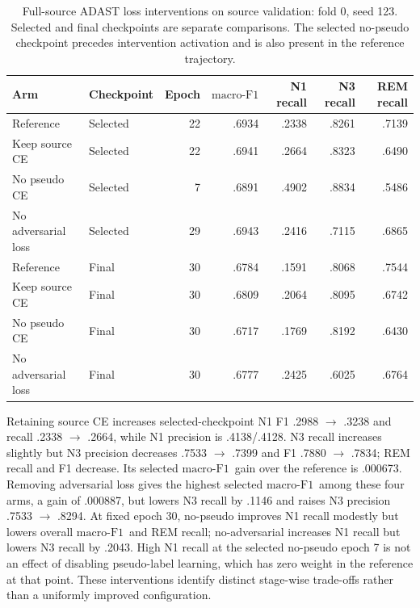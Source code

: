 \documentclass[10pt,a4paper]{article}
\newcommand{\mf}{\ensuremath{\mathrm{macro\text{-}F1}}}
\begin{document}
\begin{table}[H]
\centering\small
\caption{Full-source ADAST loss interventions on source validation: fold 0, seed 123.
Selected and final checkpoints are separate comparisons. The selected no-pseudo checkpoint
precedes intervention activation and is also present in the reference trajectory.}
\label{tab:sup_adast_loss_development}
\begin{tabular}{llrrrrr}
\toprule
Arm & Checkpoint & Epoch & \mf & N1 recall & N3 recall & REM recall \\
\midrule
Reference & Selected & 22 & .6934 & .2338 & .8261 & .7139 \\
Keep source CE & Selected & 22 & .6941 & .2664 & .8323 & .6490 \\
No pseudo CE & Selected & 7 & .6891 & .4902 & .8834 & .5486 \\
No adversarial loss & Selected & 29 & .6943 & .2416 & .7115 & .6865 \\
\midrule
Reference & Final & 30 & .6784 & .1591 & .8068 & .7544 \\
Keep source CE & Final & 30 & .6809 & .2064 & .8095 & .6742 \\
No pseudo CE & Final & 30 & .6717 & .1769 & .8192 & .6430 \\
No adversarial loss & Final & 30 & .6777 & .2425 & .6025 & .6764 \\
\bottomrule
\end{tabular}
\end{table}

Retaining source CE increases selected-checkpoint N1 F1 .2988 $\rightarrow$ .3238 and
recall .2338 $\rightarrow$ .2664, while N1 precision is .4138/.4128. N3 recall increases
slightly but N3 precision decreases .7533 $\rightarrow$ .7399 and F1 .7880 $\rightarrow$ .7834;
REM recall and F1 decrease. Its selected \mf\ gain over the reference is .000673.
Removing adversarial loss gives the highest selected \mf\ among these four arms, a gain
of .000887, but lowers N3 recall by .1146 and raises N3 precision .7533 $\rightarrow$ .8294.
At fixed epoch 30, no-pseudo improves N1 recall modestly but lowers overall \mf\ and REM
recall; no-adversarial increases N1 recall but lowers N3 recall by .2043. High N1 recall at
the selected no-pseudo epoch 7 is not an effect of disabling pseudo-label learning, which
has zero weight in the reference at that point. These interventions identify distinct
stage-wise trade-offs rather than a uniformly improved configuration.
\end{document}
